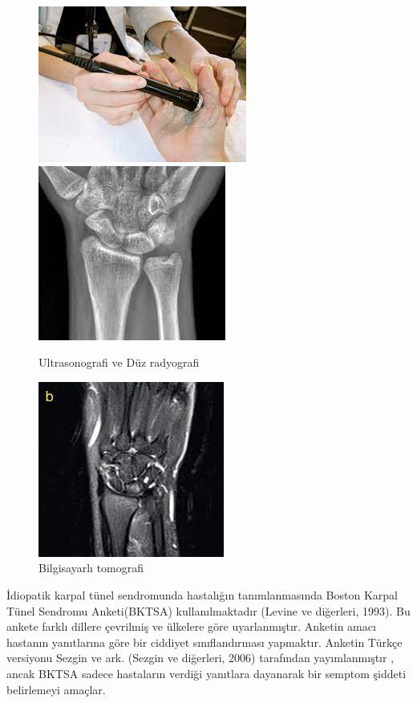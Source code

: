 \documentclass[12pt,twoside]{deuthesis}
\begin{document}
\begin{figure}

{\centering \includegraphics[width=0.49\linewidth,height=0.22\textheight]{figure/ultraradyo} \includegraphics[width=0.49\linewidth,height=0.22\textheight]{figure/radyog} 

}

\caption{Ultrasonografi ve Düz radyografi }\label{fig:unnamed-chunk-5}
\end{figure}
\begin{figure}

{\centering \includegraphics[width=0.49\linewidth,height=0.22\textheight]{figure/bt} 

}

\caption{Bilgisayarlı tomografi }\label{fig:unnamed-chunk-6}
\end{figure}
İdiopatik karpal tünel sendromunda hastalığın tanımlanmasında Boston Karpal Tünel Sendromu
Anketi(BKTSA) kullanılmaktadır (Levine ve diğerleri, 1993). Bu ankete farklı dillere çevrilmiş ve ülkelere göre uyarlanmıştır. Anketin amacı hastanın yanıtlarına göre bir ciddiyet sınıflandırması yapmaktır. Anketin Türkçe versiyonu Sezgin ve ark. (Sezgin ve diğerleri, 2006) tarafından yayımlanmıştır , ancak BKTSA sadece hastaların verdiği yanıtlara dayanarak bir semptom şiddeti belirlemeyi amaçlar.
\end{document}
